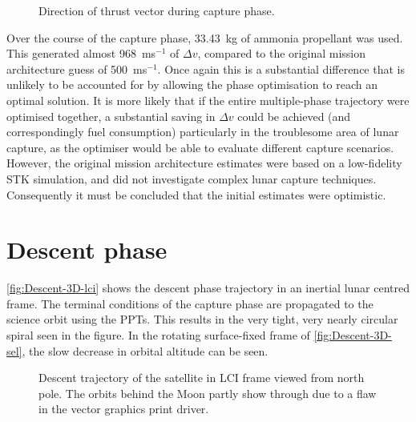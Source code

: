 \begin{figure}
\centering
\def\svgwidth{\figurewidth}

\caption{Direction of thrust vector during capture phase.} \label{fig:Capture-thrust}
\end{figure}

Over the course of the capture phase, 33.43~kg of ammonia propellant was used. This generated almost 968~ms$^{-1}$ of $\Delta v$, compared to the original mission architecture guess of 500~ms$^{-1}$. Once again this is a substantial difference that is unlikely to be accounted for by allowing the phase optimisation to reach an optimal solution. It is more likely that if the entire multiple-phase trajectory were optimised together, a substantial saving in $\Delta v$ could be achieved (and correspondingly fuel consumption) particularly in the troublesome area of lunar capture, as the optimiser would be able to evaluate different capture scenarios. However, the original mission architecture estimates were based on a low-fidelity STK simulation, and did not investigate complex lunar capture techniques. Consequently it must be concluded that the initial estimates were optimistic.



\clearpage


\section{Descent phase} \label{sec:Descent}

\autoref{fig:Descent-3D-lci} shows the descent phase trajectory in an inertial lunar centred frame. The terminal conditions of the capture phase are propagated to the science orbit using the PPTs. This results in the very tight, very nearly circular spiral seen in the figure.
In the rotating surface-fixed frame of \autoref{fig:Descent-3D-sel}, the slow decrease in orbital altitude can be seen.

\begin{figure}[h]
\centering
\def\svgwidth{\figurewidth}

\caption{Descent trajectory of the satellite in LCI frame viewed from north pole. The orbits behind the Moon partly show through due to a flaw in the vector graphics print driver.} \label{fig:Descent-3D-lci}
\end{figure}

